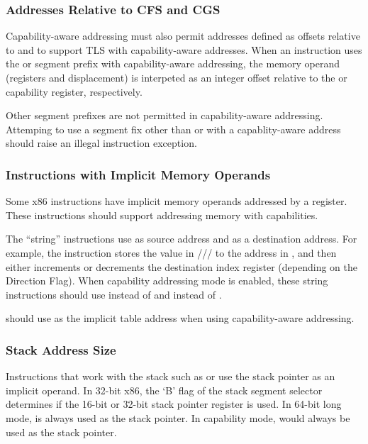 \subsubsection{Addresses Relative to CFS and CGS}
\label{sec:x86:cfs-cgs}

Capability-aware addressing must also permit addresses defined as
offsets relative to \CFS{} and \CGS{} to support TLS with
capability-aware addresses.  When an instruction uses the \FS{} or
\GS{} segment prefix with capability-aware addressing, the memory
operand (registers and displacement) is interpeted as an integer
offset relative to the \CFS{} or \CGS{} capability register,
respectively.

Other segment prefixes are not permitted in capability-aware
addressing.  Attemping to use a segment fix other than \FS{} or
\GS{} with a capablity-aware address should raise an illegal
instruction exception.

\subsubsection{Instructions with Implicit Memory Operands}

Some x86 instructions have implicit memory operands addressed by a
register.  These instructions should support addressing memory with
capabilities.

The ``string''
instructions use \RSI{} as source address and \RDI{} as a destination address.
For example, the
 instruction stores the value in \AL{}/\AX{}/\EAX{}/\RAX{} to the address in
\RDI{}, and then either increments or decrements the destination
index register (depending on the Direction Flag).  When capability
addressing mode is enabled,
these string instructions should use \CSI{} instead of \RSI{} and \CDI{} instead of
\RDI{}.

 should use \CBX{} as the implicit table address when
using capability-aware addressing.

\subsubsection{Stack Address Size}

Instructions that work with the stack such as  or
 use the stack pointer as an implicit operand.  In
32-bit x86, the `B' flag of the stack segment selector determines if
the 16-bit or 32-bit stack pointer register is used.  In 64-bit long
mode, \RSP{} is always used as the stack pointer.  In capability mode,
\CSP{} would always be used as the stack pointer.

